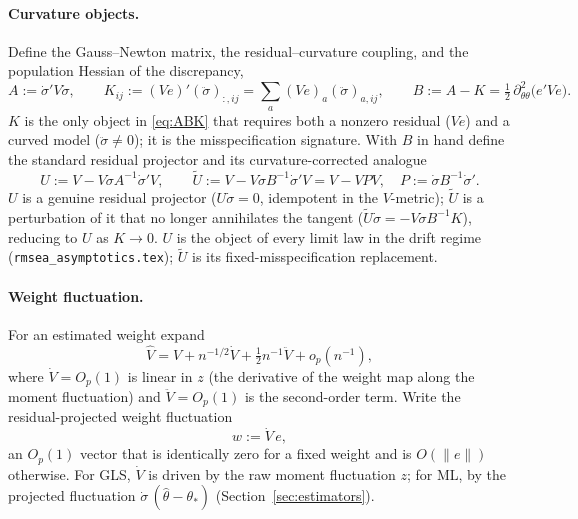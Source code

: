 \documentclass[11pt]{article}
\theoremstyle{plain}
\theoremstyle{remark}
\begin{document}
\paragraph{Curvature objects.}
Define the Gauss--Newton matrix, the residual--curvature coupling, and the
population Hessian of the discrepancy,
\begin{equation}\label{eq:ABK}
  A := \dot\sigma'V\dot\sigma,
  \qquad
  K_{ij} := (Ve)'(\ddot\sigma)_{:,ij}=\sum_a (Ve)_a(\ddot\sigma)_{a,ij},
  \qquad
  B := A-K = \tfrac12\,\partial^2_{\theta\theta}\big(e'Ve\big).
\end{equation}
$K$ is the only object in \eqref{eq:ABK} that requires both a nonzero residual
($Ve$) and a curved model ($\ddot\sigma\ne0$); it is the misspecification
signature. With $B$ in hand define the standard residual projector and its
curvature-corrected analogue
\begin{equation}\label{eq:Utilde}
  U := V-V\dot\sigma A^{-1}\dot\sigma'V,
  \qquad
  \tilde U := V-V\dot\sigma B^{-1}\dot\sigma'V = V-VPV,\quad P:=\dot\sigma B^{-1}\dot\sigma'.
\end{equation}
$U$ is a genuine residual projector ($U\dot\sigma=0$, idempotent in the
$V$-metric); $\tilde U$ is a perturbation of it that no longer annihilates the
tangent ($\tilde U\dot\sigma=-V\dot\sigma B^{-1}K$), reducing to $U$ as $K\to0$.
$U$ is the object of every limit law in the drift regime
(\texttt{rmsea\_asymptotics.tex}); $\tilde U$ is its fixed-misspecification
replacement.

\paragraph{Weight fluctuation.}
For an estimated weight expand
\begin{equation}\label{eq:weightexp}
  \hat V = V + n^{-1/2}\dot V + \tfrac12 n^{-1}\ddot V + o_p(n^{-1}),
\end{equation}
where $\dot V=O_p(1)$ is linear in $z$ (the derivative of the weight map along
the moment fluctuation) and $\ddot V=O_p(1)$ is the second-order term. Write the
residual-projected weight fluctuation
\begin{equation}\label{eq:w}
  w := \dot V\,e,
\end{equation}
an $O_p(1)$ vector that is identically zero for a fixed weight and is $O(\|e\|)$
otherwise. For GLS, $\dot V$ is driven by the raw moment fluctuation $z$; for ML,
by the projected fluctuation $\dot\sigma\,(\hat\theta-\theta_\ast)$
(Section~\ref{sec:estimators}).
\end{document}
